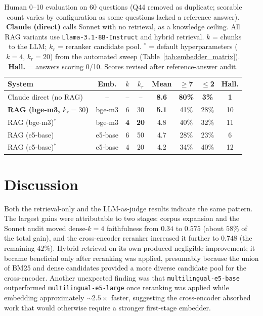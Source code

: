 \documentclass[fleqn,moreauthors,10pt]{ds_report}
\begin{document}
\begin{table}[hbt]
	\caption{Human 0--10 evaluation on 60 questions (Q44 removed as duplicate; scorable count varies by configuration as some questions lacked a reference answer). \textbf{Claude (direct)} calls Sonnet with no retrieval, as a knowledge ceiling. All RAG variants use \texttt{Llama-3.1-8B-Instruct} and hybrid retrieval. $k$ = chunks to the LLM; $k_r$ = reranker candidate pool. $^*$ = default hyperparameters ($k{=}4$, $k_r{=}20$) from the automated sweep (Table~\ref{tab:embedder_matrix}). \textbf{Hall.} = answers scoring 0/10. Scores revised after reference-answer audit.}
	\centering
	\small
	\begin{tabular}{l|c|c|c|c|c|c|c}
		\toprule
		\textbf{System} & \textbf{Emb.} & $k$ & $k_r$ & \textbf{Mean} & \textbf{$\geq$7} & \textbf{$\leq$2} & \textbf{Hall.} \\
		\midrule
		Claude direct (no RAG) & -- & -- & -- & \textbf{8.6} & \textbf{80\%} & \textbf{3\%} & \textbf{1} \\
		\textbf{RAG (bge-m3, $k_r{=}30$)} & bge-m3 & 6 & 30 & \textbf{5.1} & 41\% & 28\% & 10 \\
		RAG (bge-m3)$^*$ & bge-m3 & \textbf{4} & \textbf{20} & 4.8 & 40\% & 32\% & 11 \\
		RAG (e5-base) & e5-base & 6 & 50 & 4.7 & 28\% & 23\% & 6 \\
		RAG (e5-base)$^*$ & e5-base & 4 & 20 & 4.2 & 34\% & 40\% & 12 \\
		\bottomrule
	\end{tabular}
	\label{tab:human_eval}
\end{table}


\section*{Discussion}

Both the retrieval-only and the LLM-as-judge results indicate the same pattern. The largest gains were attributable to two stages: corpus expansion and the Sonnet audit moved dense-$k{=}4$ faithfulness from $0.34$ to $0.575$ (about $58\%$ of the total gain), and the cross-encoder reranker increased it further to $0.748$ (the remaining $42\%$). Hybrid retrieval on its own produced negligible improvement; it became beneficial only after reranking was applied, presumably because the union of BM25 and dense candidates provided a more diverse candidate pool for the cross-encoder. Another unexpected finding was that \texttt{multilingual-e5-base} outperformed \texttt{multilingual-e5-large} once reranking was applied while embedding approximately $\sim2.5\times$ faster, suggesting the cross-encoder absorbed work that would otherwise require a stronger first-stage embedder.
\end{document}
